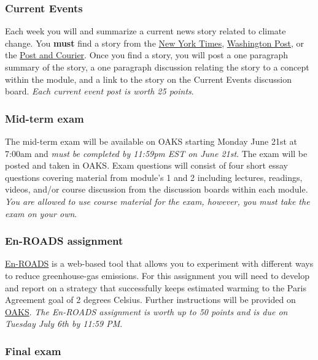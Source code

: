 \hypertarget{current-events}{%
\subsubsection{Current Events}\label{current-events}}

Each week you will and summarize a current news story related to climate
change. You \textbf{must} find a story from the
\href{https://www.nytimes.com/}{New York Times},
\href{https://www.washingtonpost.com/}{Washington Post}, or the
\href{https://www.postandcourier.com/}{Post and Courier}. Once you find
a story, you will post a one paragraph summary of the story, a one
paragraph discussion relating the story to a concept within the module,
and a link to the story on the Current Events discussion board.
\emph{Each current event post is worth 25 points}.

\hypertarget{mid-term-exam}{%
\subsubsection{Mid-term exam}\label{mid-term-exam}}

The mid-term exam will be available on OAKS starting Monday June 21st at
7:00am and \emph{must be completed by 11:59pm EST on June 21st}. The
exam will be posted and taken in OAKS. Exam questions will consist of
four short essay questions covering material from module's 1 and 2
including lectures, readings, videos, and/or course discussion from the
discussion boards within each module. \emph{You are allowed to use
course material for the exam, however, you must take the exam on your
own}.

\hypertarget{en-roads-assignment}{%
\subsubsection{En-ROADS assignment}\label{en-roads-assignment}}

\href{https://www.climateinteractive.org/tools/en-roads/}{En-ROADS} is a
web-based tool that allows you to experiment with different ways to
reduce greenhouse-gas emissions. For this assignment you will need to
develop and report on a strategy that successfully keeps estimated
warming to the Paris Agreement goal of 2 degrees Celsius. Further
instructions will be provided on \href{https://lms.cofc.edu}{OAKS}.
\emph{The En-ROADS assignment is worth up to 50 points and is due on
Tuesday July 6th by 11:59 PM}.

\hypertarget{final-exam}{%
\subsubsection{Final exam}\label{final-exam}}


